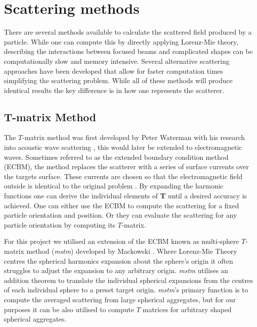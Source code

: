 \section{Scattering methods}
\label{sec:scattering}
There are several methods available to calculate the scattered 
field produced by a particle. While one can compute this by 
directly applying Lorenz-Mie theory, describing the interactions 
between focused beams and complicated shapes can be computationally 
slow and memory intensive. Several alternative scattering approaches 
have been developed that allow for faster computation times 
simplifying the scattering problem. While all of these methods will
produce identical results the key difference is in how one represents
the scatterer.
\subsection{T-matrix Method}

The $T$-matrix method was first developed by Peter Waterman with 
his research into acoustic wave scattering \cite{Waterman1969}, 
this would later be extended to electromagnetic waves. Sometimes 
referred to as the extended boundary condition method (ECBM), the 
method replaces the scatterer with a series of surface currents 
over the targets surface. These currents are chosen so that the 
electromagnetic field outside is identical to the original problem 
\cite{Wriedt1998}. By expanding the harmonic functions one can 
derive the individual elements of \textbf{T} until a desired 
accuracy is achieved. One can either use the ECBM to compute the 
scattering for a fixed particle orientation and position. Or they
can evaluate the scattering for any particle orientation by 
computing its $T$-matrix.

For this project we utilised an extension of the ECBM known as 
multi-sphere $T$-matrix method (\textit{mstm}) developed by 
Mackowski \cite{Mackowski2011}. Where Lorenz-Mie Theory centres
the spherical harmonics expansion about the sphere's origin it
often struggles to adjust the expansion to any arbitrary origin.
\textit{mstm} utilises an addition theorem to translate the 
individual spherical expansions from the centres of each 
individual sphere to a preset target origin. \textit{mstm}'s 
primary function is to compute the averaged scattering from 
large spherical aggregates, but for our purposes it can be
also utilised to compute $T$ matrices for arbitrary shaped
spherical aggregates.

